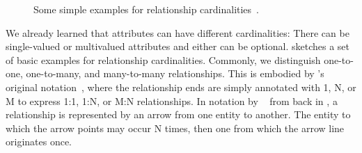 %
%
\label{sec:conceptual:relationshipCardinalities}%
%
\begin{figure}%
%
%
%
\floatSep%
%
%
%
\floatSep%
%
%
%
\caption{Some simple examples for relationship cardinalities~\cite{SS2005EIDDDFDB:CDDICAMP,V1999C5DMS:CDUTERM}.}%
\label{fig:relationshipCardinalities}%
%
\end{figure}%
%
We already learned that attributes can have different cardinalities:
There can be single-valued or multivalued attributes and either can be optional.
 sketches a set of basic examples for relationship cardinalities.
Commonly, we distinguish one-to-one, one-to-many, and many-to-many relationships.
This is embodied by \citeauthor{C1976TERMTAUVOD}'s original  notation~\cite{C1976TERMTAUVOD}, where the relationship ends are simply annotated with 1, N, or M to express 1:1, 1:N, or M:N relationships.
In notation by \citeauthor{B1969DSD}~\cite{B1969DSD} from back in \citeyear{B1969DSD}, a relationship is represented by an arrow from one entity to another.
The entity to which the arrow points may occur N times, then one from which the arrow line originates once.


